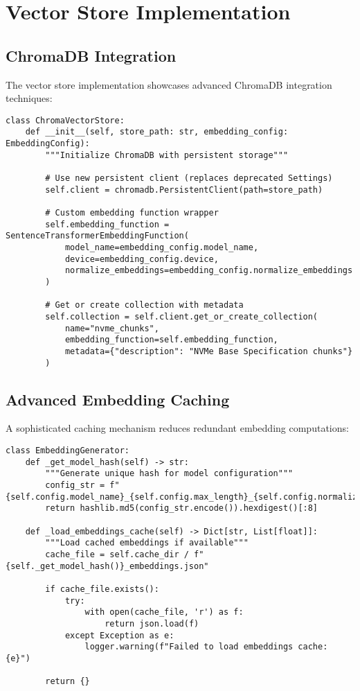 \documentclass[10pt,a4paper,twocolumn]{article}
\begin{document}
\section{Vector Store Implementation}

\subsection{ChromaDB Integration}

The vector store implementation showcases advanced ChromaDB integration techniques:

\begin{lstlisting}[caption={ChromaDB Client Configuration}]
class ChromaVectorStore:
    def __init__(self, store_path: str, embedding_config: EmbeddingConfig):
        """Initialize ChromaDB with persistent storage"""
        
        # Use new persistent client (replaces deprecated Settings)
        self.client = chromadb.PersistentClient(path=store_path)
        
        # Custom embedding function wrapper
        self.embedding_function = SentenceTransformerEmbeddingFunction(
            model_name=embedding_config.model_name,
            device=embedding_config.device,
            normalize_embeddings=embedding_config.normalize_embeddings
        )
        
        # Get or create collection with metadata
        self.collection = self.client.get_or_create_collection(
            name="nvme_chunks",
            embedding_function=self.embedding_function,
            metadata={"description": "NVMe Base Specification chunks"}
        )
\end{lstlisting}

\subsection{Advanced Embedding Caching}

A sophisticated caching mechanism reduces redundant embedding computations:

\begin{lstlisting}[caption={Embedding Cache Implementation}]
class EmbeddingGenerator:
    def _get_model_hash(self) -> str:
        """Generate unique hash for model configuration"""
        config_str = f"{self.config.model_name}_{self.config.max_length}_{self.config.normalize_embeddings}"
        return hashlib.md5(config_str.encode()).hexdigest()[:8]
    
    def _load_embeddings_cache(self) -> Dict[str, List[float]]:
        """Load cached embeddings if available"""
        cache_file = self.cache_dir / f"{self._get_model_hash()}_embeddings.json"
        
        if cache_file.exists():
            try:
                with open(cache_file, 'r') as f:
                    return json.load(f)
            except Exception as e:
                logger.warning(f"Failed to load embeddings cache: {e}")
        
        return {}
\end{lstlisting}
\end{document}
